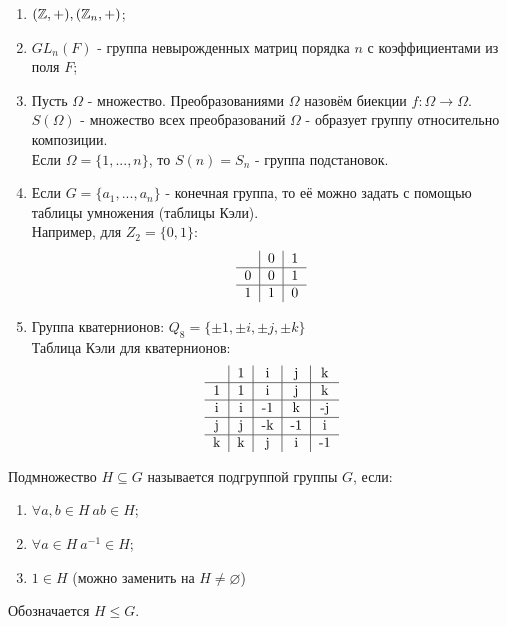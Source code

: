 \begin{examples} \tab
    \begin{enumerate}
        \item $(\mathbb{Z}, +), (\mathbb{Z}_n, +)$;
        \item $GL_n(F)$ - группа невырожденных матриц порядка $n$ с коэффициентами из поля $F$;
        \item Пусть $\Omega$ - множество. Преобразованиями $\Omega$ назовём биекции $f: \Omega \rightarrow \Omega$.\\
        $S(\Omega)$ - множество всех преобразований $\Omega$ - образует группу относительно композиции.\\
        Если $\Omega = \{1,...,n\}$, то $S(n) = S_n$ - группа подстановок.
        \item Если $G = \{a_1,...,a_n\}$ - конечная группа, то её можно задать с помощью таблицы умножения (таблицы Кэли).\\
        Например, для $Z_2 = \{0,1\}$:
        $$\begin{tabular}{c|c|c}
        \null & 0 & 1\\ \hline
        0 & 0 & 1 \\ \hline
        1 & 1 & 0
        \end{tabular}$$ 
        \item Группа кватернионов: $Q_8 = \{\pm 1, \pm i, \pm j, \pm k\}$\\
        Таблица Кэли для кватернионов:
        $$\begin{tabular}{c|c|c|c|c}
        \null & 1 & i & j & k \\ \hline
        1 & 1 & i & j & k \\ \hline
        i & i & -1 & k & -j \\ \hline
        j & j & -k & -1 & i \\ \hline
        k & k & j & i & -1
        \end{tabular}$$ 
    \end{enumerate}
\end{examples}
\begin{definition}
    Подмножество $H \subseteq G$ называется подгруппой группы $G$, если:
    \begin{enumerate}
        \item $\forall a, b \in H \ ab \in H$;
        \item $\forall a \in H \ a^{-1} \in H$;
        \item $1 \in H$ (можно заменить на $H \neq \varnothing$)
    \end{enumerate}
    Обозначается $H \leq G$.
\end{definition}
